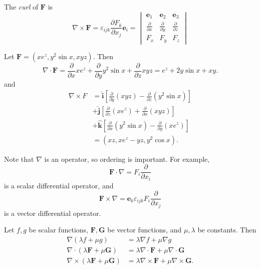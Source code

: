 \documentclass[a4paper]{article}
\begin{document}
\begin{defi}[Curl]
  The \emph{curl} of $\mathbf{F}$ is
  \[
    \nabla\times \mathbf{F} = \varepsilon_{ijk}\frac{\partial F_k}{\partial x_j}\mathbf{e}_i = \begin{vmatrix}
      \mathbf{e}_1 & \mathbf{e}_2 & \mathbf{e}_3\\
      \frac{\partial}{\partial x} & \frac{\partial}{\partial y} & \frac{\partial}{\partial z}\\
      F_x & F_y & F_z
    \end{vmatrix}
  \]
\end{defi}

\begin{eg}
  Let $\mathbf{F} = (xe^z, y^2\sin x, xyz)$. Then
  \[
    \nabla \cdot \mathbf{F} = \frac{\partial }{\partial x}xe^z + \frac{\partial}{\partial y}y^2 \sin x + \frac{\partial}{\partial z}xyz = e^z + 2y\sin x + xy.
  \]
  and
  \begin{align*}
    \nabla \times F &= \hat{\mathbf{i}} \left[\frac{\partial}{\partial y}(xyz) - \frac{\partial}{\partial z}(y^2\sin x)\right]\\
    &+ \hat{\mathbf{j}} \left[\frac{\partial}{\partial z}(xe^z) + \frac{\partial}{\partial x}(xyz)\right]\\
    &+ \hat{\mathbf{k}}\left[\frac{\partial}{\partial x}(y^2\sin x) - \frac{\partial}{\partial y} (xe^z)\right]\\
    &= (xz, xe^z - yz, y^2\cos x).
  \end{align*}
\end{eg}
Note that $\nabla$ is an operator, so ordering is important. For example,
\[
  \mathbf{F}\cdot \nabla = F_i\frac{\partial }{\partial x_i}
\]
is a scalar differential operator, and
\[
  \mathbf{F}\times \nabla = \mathbf{e}_k\varepsilon_{ijk}F_i\frac{\partial}{\partial x_j}
\]
is a vector differential operator.

\begin{prop}
  Let $f, g$ be scalar functions, $\mathbf{F}, \mathbf{G}$ be vector functions, and $\mu, \lambda$ be constants. Then
  \begin{align*}
    \nabla(\lambda f + \mu g) &= \lambda\nabla f + \mu\nabla g\\
    \nabla\cdot (\lambda \mathbf{F} + \mu \mathbf{G}) &= \lambda\nabla \cdot \mathbf{F} + \mu\nabla\cdot \mathbf{G}\\
    \nabla\times (\lambda \mathbf{F} + \mu \mathbf{G}) &= \lambda\nabla\times \mathbf{F} + \mu\nabla\times \mathbf{G}.
  \end{align*}
\end{prop}
\end{document}
